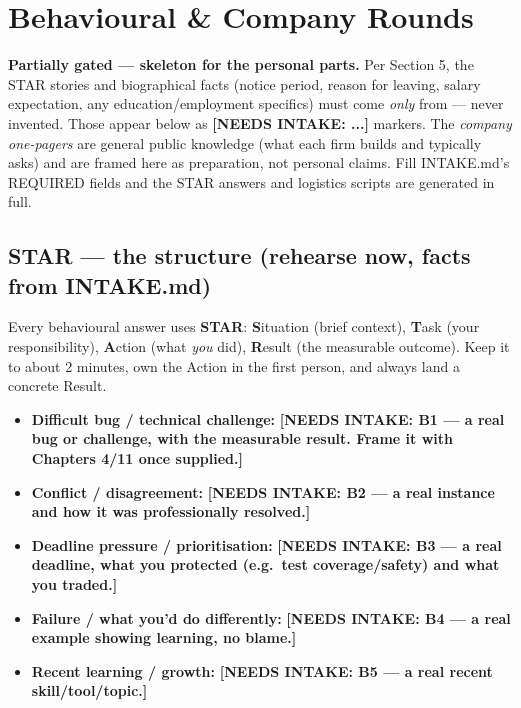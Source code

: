 \chapter{Behavioural \& Company Rounds}
\label{ch:behavioral-company}

\begin{partnote}
\textbf{Partially gated --- skeleton for the personal parts.} Per 
Section 5, the STAR stories and biographical facts (notice period, reason for
leaving, salary expectation, any education/employment specifics) must come
\emph{only} from  --- never invented. Those appear below
as \textbf{[NEEDS INTAKE: ...]} markers. The \emph{company one-pagers} are general
public knowledge (what each firm builds and typically asks) and are framed here
as preparation, not personal claims. Fill INTAKE.md's REQUIRED fields and the
STAR answers and logistics scripts are generated in full.
\end{partnote}

\section{STAR --- the structure (rehearse now, facts from INTAKE.md)}
Every behavioural answer uses \textbf{STAR}: \textbf{S}ituation (brief context),
\textbf{T}ask (your responsibility), \textbf{A}ction (what \emph{you} did),
\textbf{R}esult (the measurable outcome). Keep it to about 2 minutes, own the
Action in the first person, and always land a concrete Result.

\begin{itemize}
\item \textbf{Difficult bug / technical challenge:}
  \textbf{[NEEDS INTAKE: B1 --- a real bug or challenge, with the measurable
  result. Frame it with Chapters 4/11 once supplied.]}
\item \textbf{Conflict / disagreement:}
  \textbf{[NEEDS INTAKE: B2 --- a real instance and how it was professionally
  resolved.]}
\item \textbf{Deadline pressure / prioritisation:}
  \textbf{[NEEDS INTAKE: B3 --- a real deadline, what you protected (e.g.\ test
  coverage/safety) and what you traded.]}
\item \textbf{Failure / what you'd do differently:}
  \textbf{[NEEDS INTAKE: B4 --- a real example showing learning, no blame.]}
\item \textbf{Recent learning / growth:}
  \textbf{[NEEDS INTAKE: B5 --- a real recent skill/tool/topic.]}
\end{itemize}


